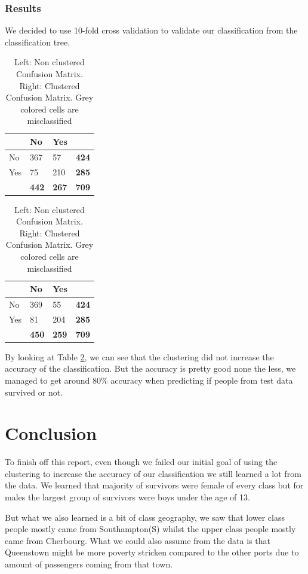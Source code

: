 \documentclass[a4paper,11pt]{article}
\begin{document}
\subsubsection{Results}
We decided to use 10-fold cross validation to validate our classification from the classification tree.

\begin{table}[h]
\begin{center}
\begin{tabular}{|l|l|l|l|}
\hline
& No & Yes &\\
\hline
No & 367 & \cellcolor{gray!30}57 & \textbf{424}\\
Yes &  \cellcolor{gray!30}75 & 210 & \textbf{285}\\
& \textbf{442} & \textbf{267} & \textbf{709}\\
\hline
\end{tabular}
\begin{tabular}{|l|l|l|l|}
\hline
& No & Yes &\\
\hline
No & 369 & \cellcolor{gray!30}55 & \textbf{424}\\
Yes &  \cellcolor{gray!30} 81 & 204 & \textbf{285}\\
& \textbf{450} & \textbf{259} & \textbf{709}\\
\hline
\end{tabular}
\caption{Left: Non clustered Confusion Matrix. Right: Clustered Confusion Matrix. Grey colored cells are misclassified}
\label{confusionMatrix}
\end{center}
\end{table}

By looking at Table \ref{confusionMatrix}, we can see that the clustering did not increase the accuracy of the classification. But the accuracy is pretty good none the less, we managed to get around 80\% accuracy when predicting if people from test data survived or not.

\clearpage
\section{Conclusion}
To finish off this report, even though we failed our initial goal of using the clustering to increase the accuracy of our classification we still learned a lot from the data. We learned that majority of survivors were female of every class but for males the largest group of survivors were boys under the age of 13.

But what we also learned is a bit of class geography, we saw that lower class people mostly came from Southampton(S) whilst the upper class people mostly came from Cherbourg. What we could also assume from the data is that Queenstown might be more poverty stricken compared to the other ports due to amount of passengers coming from that town.
\end{document}
